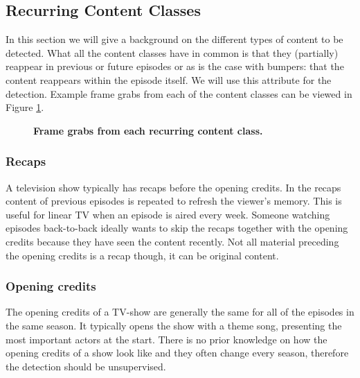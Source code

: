 \documentclass{article}
\begin{document}
\subsection{Recurring Content Classes} \label{section:segmentclasses}
In this section we will give a background on the different types of content to be detected. What all the content classes have in common is that they (partially) reappear in previous or future episodes or as is the case with bumpers: that the content reappears within the episode itself. We will use this attribute for the detection. Example frame grabs from each of the content classes can be viewed in Figure \ref{fig:introductionexamples}.

\begin{figure}[h]
	\caption{\textbf{Frame grabs from each recurring content class.}}
	\label{fig:introductionexamples}
\end{figure}

\subsubsection{Recaps}
A television show typically has recaps before the opening credits. In the recaps content of previous episodes is repeated to refresh the viewer's memory. This is useful for linear TV when an episode is aired every week. Someone watching episodes back-to-back ideally wants to skip the recaps together with the opening credits because they have seen the content recently. Not all material preceding the opening credits is a recap though, it can be original content.

\subsubsection{Opening credits}
The opening credits of a TV-show are generally the same for all of the episodes in the same season. It typically opens the show with a theme song, presenting the most important actors at the start. There is no prior knowledge on how the opening credits of a show look like and they often change every season, therefore the detection should be unsupervised.
\end{document}
